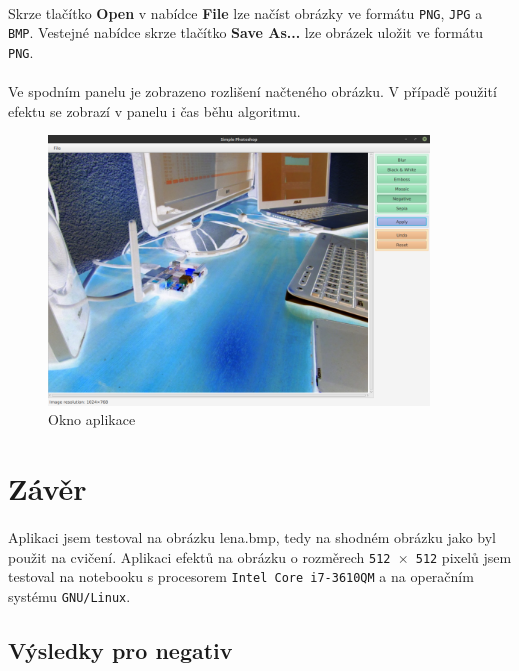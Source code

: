 \documentclass[12pt]{scrartcl}
\begin{document}
\paragraph{}
Skrze tlačítko \textbf{Open} v nabídce \textbf{File} lze načíst obrázky ve formátu \texttt{PNG}, \texttt{JPG} a \texttt{BMP}. Ve\nobreakspace stejné nabídce skrze tlačítko \textbf{Save As...} lze obrázek uložit ve formátu \texttt{PNG}.

\paragraph{}
Ve spodním panelu je zobrazeno rozlišení načteného obrázku. V případě použití efektu se zobrazí v panelu i čas běhu algoritmu.

\begin{figure}[!ht]
	\centering
	\label{obr:aplikace}
	\includegraphics[width=0.9\textwidth,natwidth=1,natheight=1]{app_gui.pdf}
	\caption{Okno aplikace}
\end{figure}	

\newpage
\section{Závěr}
\paragraph{}
Aplikaci jsem testoval na obrázku \textsf{lena.bmp}, tedy na shodném obrázku jako byl použit na cvičení. Aplikaci efektů na obrázku o rozměrech \texttt{512 $\times$ 512} pixelů jsem testoval na notebooku s procesorem \texttt{Intel Core i7-3610QM} a na operačním systému \texttt{GNU/Linux}.

\subsection{Výsledky pro negativ}
\end{document}
